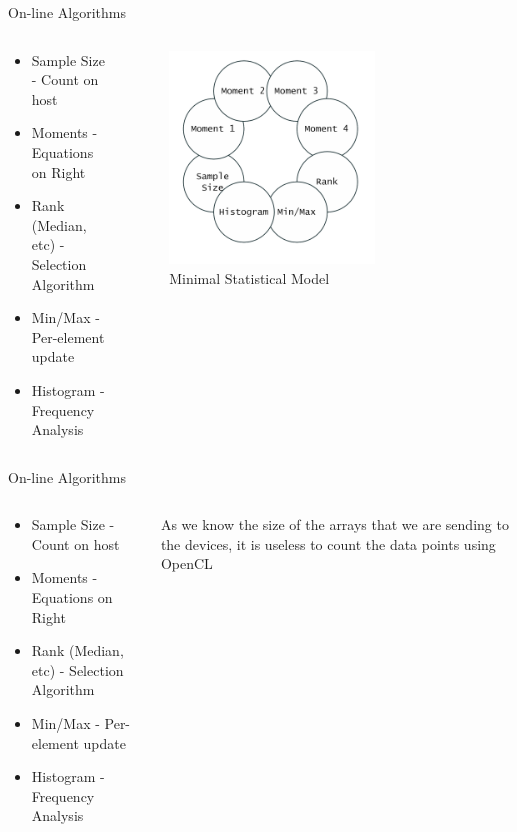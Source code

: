 \documentclass[10pt,aspectratio=169]{beamer} %
\newcommand{\hide}[1] {
	\textcolor{hiddencolor}{#1}
}
\begin{document}
\begin{frame}{On-line Algorithms}
\begin{columns}[c]
\begin{column}{0.5\textwidth}
\begin{itemize}
\item Sample Size - Count on host
\item Moments - Equations on Right
\item Rank (Median, etc) - Selection Algorithm
\item Min/Max - Per-element update
\item Histogram - Frequency Analysis
\end{itemize}
\end{column}
\begin{column}{0.5\textwidth}
\begin{figure}
    \includegraphics[width=0.68\textwidth]{fundamental.png}
    \caption{Minimal Statistical Model}
\end{figure}
\end{column}
\end{columns}
\end{frame}

\begin{frame}{On-line Algorithms}
\begin{columns}[c]
\begin{column}{0.5\textwidth}
\begin{itemize}
\item \alert{Sample Size - Count on host}
\item \hide{Moments - Equations on Right}
\item \hide{Rank (Median, etc) - Selection Algorithm}
\item \hide{Min/Max - Per-element update}
\item \hide{Histogram - Frequency Analysis}
\end{itemize}
\end{column}
\begin{column}{0.5\textwidth}
As we know the size of the arrays that we are sending to the devices, it is useless to count the data points using OpenCL
\end{column}
\end{columns}
\end{frame}
\end{document}
